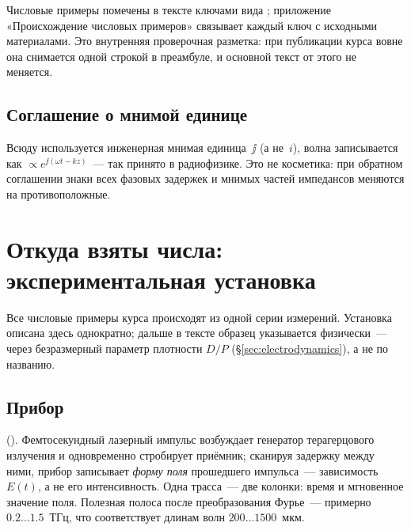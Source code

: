 \ifprovenance
\begin{tcolorbox}[enhanced,colback=cPanel,colframe=cGrid,boxrule=0.8pt,arc=2pt,
                  title={\bfseries\color{cInk2} Служебная пометка},coltitle=cInk2,
                  attach boxed title to top left={xshift=6pt,yshift=-2pt},
                  boxed title style={colback=cPanel,boxrule=0pt,arc=0pt},top=10pt]
\small Числовые примеры помечены в тексте ключами вида ; приложение
«Происхождение числовых примеров» связывает каждый ключ с исходными материалами. Это внутренняя
проверочная разметка: при публикации курса вовне она снимается одной строкой в преамбуле, и
основной текст от этого не меняется.
\end{tcolorbox}
\fi

\subsection*{Соглашение о мнимой единице}

Всюду используется инженерная мнимая единица~$\jj$ (а не~$i$), волна записывается как
$\propto e^{\jj(\omega t-kz)}$~--- так принято в радиофизике. Это не косметика: при обратном
соглашении знаки всех фазовых задержек и мнимых частей импедансов меняются на противоположные.

\section*{Откуда взяты числа: экспериментальная установка}
\label{sec:setup}

Все числовые примеры курса происходят из одной серии измерений. Установка описана здесь
однократно; дальше в тексте образец указывается физически~--- через безразмерный параметр
плотности $D/P$ (§\ref{sec:electrodynamics}), а не по названию.

\subsection*{Прибор}

 (). Фемтосекундный лазерный
импульс возбуждает генератор терагерцового излучения и одновременно стробирует приёмник;
сканируя задержку между ними, прибор записывает \emph{форму поля} прошедшего импульса~---
зависимость $E(t)$, а не его интенсивность. Одна трасса~--- две колонки: время и мгновенное
значение поля. Полезная полоса после преобразования Фурье~--- примерно $0.2\ldots1.5$~ТГц, что
соответствует длинам волн $200\ldots1500$~мкм.

